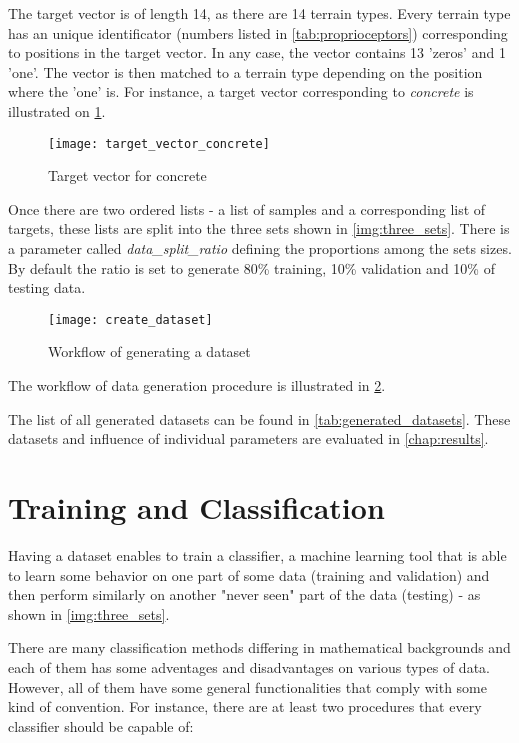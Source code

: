 The target vector is of length 14, as there are 14 terrain types. Every terrain type has an unique identificator (numbers listed in \cref{tab:proprioceptors}) corresponding to positions in the target vector. In any case, the vector contains 13 'zeros' and 1 'one'. The vector is then matched to a terrain type depending on the position where the 'one' is. For instance, a target vector corresponding to \textit{concrete} is illustrated on \cref{img:target_vector_concrete}.

\begin{figure}[H]
  \centering
  \texttt{[image: target\_vector\_concrete]}
  \caption{Target vector for concrete}
  \label{img:target_vector_concrete}
\end{figure}

Once there are two ordered lists - a list of samples and a corresponding list of targets, these lists are split into the three sets shown in \cref{img:three_sets}. There is a parameter called \textit{data\_split\_ratio} defining the proportions among the sets sizes. By default the ratio is set to generate 80\% training, 10\% validation and 10\% of testing data.

\begin{figure}[H]
  \centering
  \texttt{[image: create\_dataset]}
  \caption{Workflow of generating a dataset}
  \label{img:create_dataset}
\end{figure}

The workflow of data generation procedure is illustrated in \cref{img:create_dataset}. 

The list of all generated datasets can be found in \cref{tab:generated_datasets}. These datasets and influence of individual parameters are evaluated in \cref{chap:results}.

\section{Training and Classification}
Having a dataset enables to train a classifier, a machine learning tool that is able to learn some behavior on one part of some data (training and validation) and then perform similarly on another "never seen" part of the data (testing) - as shown in \cref{img:three_sets}.

There are many classification methods differing in mathematical backgrounds and each of them has some adventages and disadvantages on various types of data. However, all of them have some general functionalities that comply with some kind of convention. For instance, there are at least two procedures that every classifier should be capable of:

